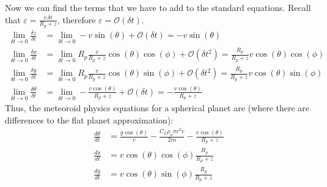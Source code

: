 Now we can find the terms that we have to add to the standard equations. Recall that $\varepsilon = \frac{v\,\delta t}{R_p + z}$, therefore $\varepsilon = \mathcal{O}(\delta t)$.
\begin{align}
    \lim_{\delta t \rightarrow 0} \frac{\delta z}{\delta t} &= \lim_{\delta t \rightarrow 0} -v\sin(\theta) + \mathcal{O}(\delta t) = -v\sin(\theta) \\
    \lim_{\delta t \rightarrow 0} \frac{\delta x}{\delta t} &= \lim_{\delta t \rightarrow 0} R_p \frac{v}{R_p + z}\cos(\theta)\cos(\phi) + \mathcal{O}(\delta t^2) = \frac{R_p}{R_p + z}v\cos(\theta)\cos(\phi) \\
    \lim_{\delta t \rightarrow 0} \frac{\delta y}{\delta t} &= \lim_{\delta t \rightarrow 0} R_p \frac{v}{R_p + z}\cos(\theta)\sin(\phi) + \mathcal{O}(\delta t^2) = \frac{R_p}{R_p + z}v\cos(\theta)\sin(\phi) \\
    \lim_{\delta t \rightarrow 0} \frac{\delta\theta}{\delta t} &= \lim_{\delta t \rightarrow 0} -\frac{v\cos(\theta)}{R_p+z} + \mathcal{O}(\delta t) = -\frac{v\cos(\theta)}{R_p+z}
\end{align}
Thus, the meteoroid physics equations for a spherical planet are (where there are differences to the flat planet approximation):
\begin{align}
    \frac{d\theta}{dt} &= \frac{g\cos(\theta)}{v} - \frac{C_L \rho_a \pi r^2 v}{2m} - \frac{v\cos(\theta)}{R_p + z} \\
    \frac{dx}{dt} &= v\cos(\theta)\cos(\phi) \frac{R_p}{R_p + z} \\
    \frac{dy}{dt} &= v\cos(\theta)\sin(\phi) \frac{R_p}{R_p + z}
\end{align}


